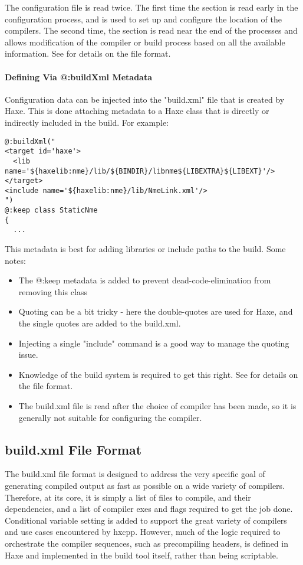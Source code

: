 The configuration file is read twice.  The first time the  section is read early in the configuration process, and is used to set up and configure the location of the compilers.  The second time, the  section is read near the end of the processes and allows modification of the compiler or build process based on all the available information.  See  for details on the file format.

\paragraph{Defining Via @:buildXml Metadata}
Configuration data can be injected into the "build.xml" file that is created by Haxe.  This is done attaching metadata to a Haxe class that is directly or indirectly included in the build.  For example:
\begin{lstlisting}
@:buildXml("
<target id='haxe'>
  <lib name='${haxelib:nme}/lib/${BINDIR}/libnme${LIBEXTRA}${LIBEXT}'/>
</target>
<include name='${haxelib:nme}/lib/NmeLink.xml'/>
")
@:keep class StaticNme
{
  ...
\end{lstlisting}

This metadata is best for adding libraries or include paths to the build.
Some notes:
\begin{itemize}
	\item The @:keep metadata is added to prevent dead-code-elimination from removing this class
	\item Quoting can be a bit tricky - here the double-quotes are used for Haxe, and the single quotes are added to the build.xml.
	\item Injecting a single "include" command is a good way to manage the quoting issue.
	\item Knowledge of the build system is required to get this right. See  for details on the file format.
	\item The build.xml file is read after the choice of compiler has been made, so it is generally not suitable for configuring the compiler.
\end{itemize}


\subsection{build.xml File Format}
\label{target-cpp-file-format}
The build.xml file format is designed to address the very specific goal of generating compiled output as fast as possible on a wide variety of compilers.  Therefore, at its core, it is simply a list of files to compile, and their dependencies, and a list of compiler exes and flags required to get the job done.  Conditional variable setting is added to support the great variety of compilers and use cases encountered by hxcpp.  However, much of the logic required to orchestrate the compiler sequences, such as precompiling headers, is defined in Haxe and implemented in the build tool itself, rather than being scriptable.

